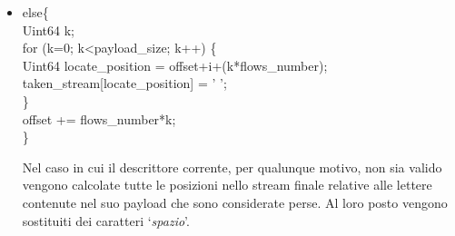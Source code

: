 \begin{itemize}
\begin{notabene}
Non ha senso effettuare paragoni tra descrittori appartenenti a flussi diversi, in quanto non sono in alcun modo correlati.
\end{notabene}
Se il descrittore corrente viene ritenuto valido all'interno del Multiple
Description Stream si passa alla decodifica. Viene prelevato il payload e
trasferito in una struttura dati in memoria (Memory DataChunk). Il contenitore temporaneo dello stream decodificato viene ridimensionato per contenere (potenzialmente) tutti i payload provenienti da tutti i descrittori. \`E possibile raggiungere la dimensione massima esclusivamente nel caso in cui non vi sia alcun errore di trasmissione. Successivamente si prelevano le singole lettere dalla struttura dati in memoria. Se la i-esima lettera estratta ha un codice ascii diverso da `\emph{0}' si passa al calcolo della sua posizione assoluta all'interno dello stream finale (decodificato) e al posizionamento del carattere corrente in tale posizione. Infine viene aggiornato un contatore che tiene conto della massima posizione raggiunta in tale fase. Tale contatore servirà successivamente, pertanto il suo significato verrà descritto in seguito.

 \item \begin{code}
else\{\\
	Uint64 k;\\
	for (k=0; k<payload\_size; k++) \{\\
		Uint64 locate\_position = offset+i+(k*flows\_number);\\
		taken\_stream[locate\_position] = ' ';\\
	\}\\
	offset += flows\_number*k;\\
\}\\
\end{code}
Nel caso in cui il descrittore corrente, per qualunque motivo, non sia valido vengono calcolate tutte le posizioni nello stream finale relative alle lettere contenute nel suo payload che sono considerate perse. Al loro posto vengono sostituiti dei caratteri `\emph{spazio}'.


\end{itemize}
